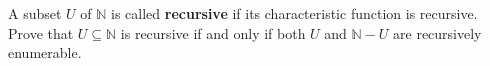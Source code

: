 A subset $U$ of $\mathbb{N}$ is called \textbf{recursive} if its characteristic function is recursive. Prove that $U \subseteq \mathbb{N}$ is recursive if and only if both $U$ and $\mathbb{N} - U$ are recursively enumerable.

